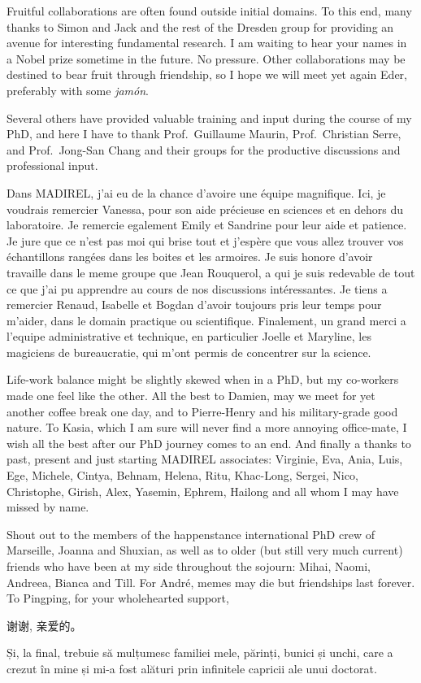 Fruitful collaborations are often found outside initial domains. 
To this end, many thanks to Simon and Jack and the rest of the Dresden 
group for providing an avenue for interesting fundamental research.
I am waiting to hear your names in a Nobel prize sometime in the
future. No pressure. Other collaborations may be destined to bear fruit
through friendship, so I hope we will meet yet again Eder, preferably 
with some \textit{jamón}.

Several others have provided valuable training and input during the 
course of my PhD, and here I have to thank Prof.\ Guillaume Maurin,
Prof.\ Christian Serre, and Prof.\ Jong-San Chang and their groups
for the productive discussions and professional input.

Dans MADIREL, j'ai eu de la chance d'avoire une équipe magnifique.
Ici, je voudrais remercier Vanessa, pour son aide précieuse en sciences
et en dehors du laboratoire.
Je remercie egalement Emily et Sandrine pour leur aide et patience.
Je jure que ce n'est pas moi qui brise tout et j'espère que vous allez
trouver vos échantillons  rangées dans les boites 
et les armoires. Je suis honore d'avoir travaille dans le meme groupe 
que Jean Rouquerol, a qui je suis redevable de tout ce que j'ai pu apprendre
au cours de nos discussions intéressantes. Je tiens a remercier 
Renaud, Isabelle et Bogdan d'avoir toujours pris leur temps pour m'aider,
dans le domain practique ou scientifique. 
Finalement, un grand merci a l'equipe administrative et technique,
en particulier Joelle et Maryline, les magiciens de bureaucratie, qui 
m'ont permis de concentrer sur la science.

Life-work balance might be slightly skewed when in a PhD, but my
co-workers made one feel like the other.
All the best to Damien, may we meet for yet another coffee break 
one day, and to Pierre-Henry and his military-grade good nature.
To Kasia, which I am sure will never find a more annoying
office-mate, I wish all the best after our PhD journey comes to 
an end.
And finally a thanks to past, present and just starting MADIREL
associates: Virginie, Eva, Ania, Luis, Ege, Michele, Cintya, Behnam, Helena,
Ritu, Khac-Long, Sergei, Nico, Christophe, Girish, Alex, Yasemin, Ephrem, Hailong
and all whom I may have missed by name.

Shout out to the members of the happenstance international PhD crew of Marseille,
Joanna and Shuxian, as well as to older (but still very much current) friends
who have been at my side throughout the sojourn: Mihai, Naomi, Andreea, Bianca
and Till. For André, memes may die but friendships last forever.
To Pingping, for your wholehearted support,
\begin{CJK*}{UTF8}{gbsn}
    谢谢, 亲爱的。
\end{CJK*}

Și, la final, trebuie să mulțumesc familiei mele, părinți, bunici și 
unchi, care a crezut în mine și mi-a fost alături prin infinitele 
capricii ale unui doctorat.
